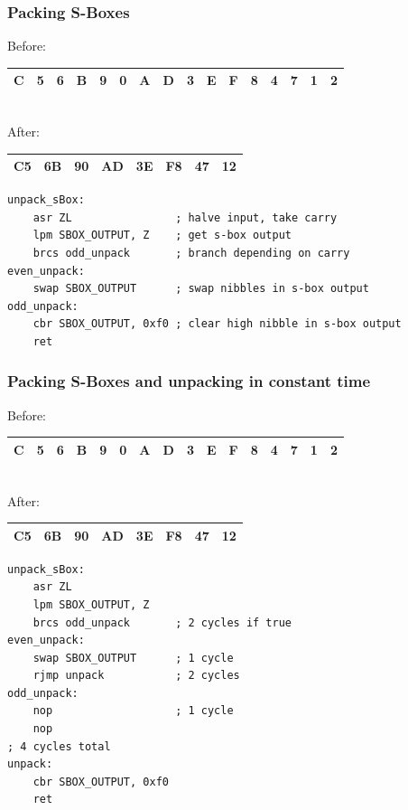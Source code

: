 \documentclass{beamer}
\begin{document}
\begin{frame}[fragile]
\frametitle{Packing S-Boxes}
	\footnotesize{
	Before: \\
	\begin{tabular}{ | c | c | c | c | c | c | c | c | c | c | c | c | c | c | c | c | }
	  \hline                        
	  C & 5 & 6 & B & 9 & 0 & A & D & 3 & E & F & 8 & 4 & 7 & 1 & 2 \\
	  \hline  
	\end{tabular}
	\\

	After: \\
	\begin{tabular}{ | c | c | c | c | c | c | c | c | }
	  \hline                        
	  C5 & 6B & 90 & AD & 3E & F8 & 47 & 12 \\
	  \hline  
	\end{tabular}
	}

\begin{lstlisting}
unpack_sBox:
    asr ZL                ; halve input, take carry
    lpm SBOX_OUTPUT, Z    ; get s-box output
    brcs odd_unpack       ; branch depending on carry
even_unpack:
    swap SBOX_OUTPUT      ; swap nibbles in s-box output
odd_unpack:
    cbr SBOX_OUTPUT, 0xf0 ; clear high nibble in s-box output
    ret
\end{lstlisting}
\end{frame}

\begin{frame}[fragile]
\frametitle{Packing S-Boxes and unpacking in constant time}
	\footnotesize{
	Before: \\
	\begin{tabular}{ | c | c | c | c | c | c | c | c | c | c | c | c | c | c | c | c | }
	  \hline                        
	  C & 5 & 6 & B & 9 & 0 & A & D & 3 & E & F & 8 & 4 & 7 & 1 & 2 \\
	  \hline  
	\end{tabular}
	\\

	After: \\
	\begin{tabular}{ | c | c | c | c | c | c | c | c | }
	  \hline                        
	  C5 & 6B & 90 & AD & 3E & F8 & 47 & 12 \\
	  \hline  
	\end{tabular}
	}

\begin{lstlisting}
unpack_sBox:
    asr ZL
    lpm SBOX_OUTPUT, Z
    brcs odd_unpack       ; 2 cycles if true
even_unpack:
    swap SBOX_OUTPUT      ; 1 cycle
    rjmp unpack           ; 2 cycles
odd_unpack:
    nop                   ; 1 cycle
    nop
; 4 cycles total
unpack:
    cbr SBOX_OUTPUT, 0xf0
    ret
\end{lstlisting}
\end{frame}
\end{document}
